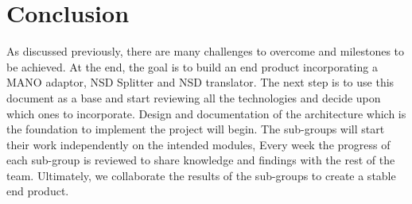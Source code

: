 \chapter{Conclusion}
\label{ch:Conclusion}
As discussed previously, there are many challenges to overcome and milestones to be achieved.
At the end, the goal is to build an end product incorporating a MANO adaptor, NSD Splitter and NSD translator. The next step is to use this document as a base and start reviewing all the technologies and decide upon which ones to incorporate. Design and documentation of the architecture which is the foundation to implement the project will begin.
The sub-groups will start their work independently on the intended modules,  Every week the progress of each sub-group is reviewed to share knowledge and findings with the rest of the team. Ultimately, we collaborate the results of the sub-groups to create a stable end product.
